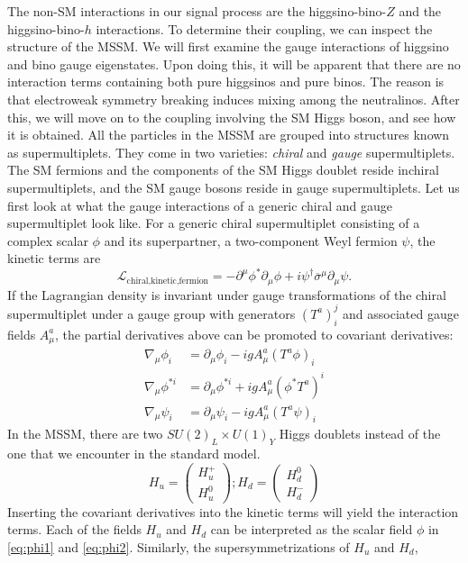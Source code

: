 The non-SM interactions in our signal process are the higgsino-bino-$Z$ and the higgsino-bino-$h$ interactions. To determine their coupling, we can inspect the structure of the MSSM. We will first examine the gauge interactions of higgsino and bino gauge eigenstates. Upon doing this, it will be apparent that there are no interaction terms containing both pure higgsinos and pure binos. The reason is that electroweak symmetry breaking induces mixing among the neutralinos. After this, we will move on to the coupling involving the SM Higgs boson, and see how it is obtained. 
All the particles in the MSSM are grouped into structures known as supermultiplets. They come in two varieties: \emph{chiral} and \emph{gauge} supermultiplets. The SM fermions and the components of the SM Higgs doublet reside inchiral supermultiplets, and the SM gauge bosons reside in gauge supermultiplets. Let us first look at what the gauge interactions of a generic chiral and gauge supermultiplet look like.
For a generic chiral supermultiplet consisting of a complex scalar $\phi$ and its superpartner, a two-component Weyl fermion $\psi$, the kinetic terms are 
\[\mathcal{L}_{\text{chiral,kinetic,fermion}} = -\partial^\mu\phi^*\partial_\mu\phi + i\psi^{\dagger}\overline{\sigma}^\mu\partial_\mu\psi.\]
If the Lagrangian density is invariant under gauge transformations of the chiral supermultiplet under a gauge group with generators $(T^a)_i^j$ and associated gauge fields $A_\mu^a$, the partial derivatives above can be promoted to covariant derivatives:
\begin{align}
  \nabla_\mu\phi_i &= \partial_\mu\phi_i - igA_\mu^a(T^a\phi)_i\label{eq:phi1}\\
  \nabla_\mu\phi^{*i} &= \partial_\mu\phi^{*i} + igA_\mu^a(\phi^*T^a)^{i}\label{eq:phi2}\\
  \nabla_\mu\psi_i &= \partial_\mu\psi_i - igA_\mu^a(T^a\psi)_i\label{eq:psi}
\end{align}
In the MSSM, there are two $SU(2)_L\times U(1)_Y$ Higgs doublets instead of the one that we encounter in the standard model.
\[H_u = \begin{pmatrix}H_u^+\\H_u^0\end{pmatrix};
H_d = \begin{pmatrix}H_d^0\\H_d^-\end{pmatrix}\]
Inserting the covariant derivatives into the kinetic terms will yield the interaction terms. Each of the fields $H_u$ and $H_d$ can be interpreted as the scalar field $\phi$ in \autoref{eq:phi1} and \autoref{eq:phi2}. Similarly, the supersymmetrizations of $H_u$ and $H_d$,
